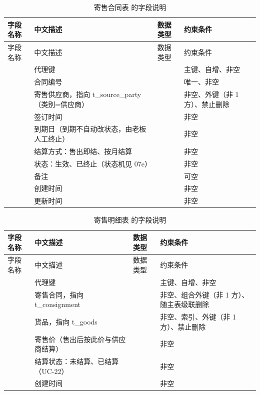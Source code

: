 \begin{longtable}{@{}L{3.5cm} L{4.1cm} L{2.9cm} L{4.0cm}@{}}
\caption{寄售合同表  的字段说明}\label{tab:f-t-consignment}\\
\toprule
字段名称 & 中文描述 & 数据类型 & 约束条件 \\
\midrule
\endfirsthead
\toprule
字段名称 & 中文描述 & 数据类型 & 约束条件 \\
\midrule
\endhead
\bottomrule
\endlastfoot
{} & 代理键 &  & 主键、自增、非空 \\
 & 合同编号 &  & 唯一、非空 \\
 & 寄售供应商，指向 t\_source\_party（类别=供应商） &  & 非空、外键（非 1 方）、禁止删除 \\
 & 签订时间 &  & 非空 \\
 & 到期日（到期不自动改状态，由老板人工终止） &  & 非空 \\
 & 结算方式：售出即结、按月结算 &  & 非空 \\
 & 状态：生效、已终止（状态机见 07e） &  & 非空 \\
 & 备注 &  & 可空 \\
 & 创建时间 &  & 非空 \\
 & 更新时间 &  & 非空 \\
\end{longtable}

\begin{longtable}{@{}L{3.5cm} L{4.1cm} L{2.9cm} L{4.0cm}@{}}
\caption{寄售明细表  的字段说明}\label{tab:f-t-consignment-item}\\
\toprule
字段名称 & 中文描述 & 数据类型 & 约束条件 \\
\midrule
\endfirsthead
\toprule
字段名称 & 中文描述 & 数据类型 & 约束条件 \\
\midrule
\endhead
\bottomrule
\endlastfoot
{} & 代理键 &  & 主键、自增、非空 \\
 & 寄售合同，指向 t\_consignment &  & 非空、组合外键（非 1 方）、随主表级联删除 \\
 & 货品，指向 t\_goods &  & 非空、索引、外键（非 1 方）、禁止删除 \\
 & 寄售价（售出后按此价与供应商结算） &  & 非空 \\
 & 结算状态：未结算、已结算（UC-22） &  & 非空 \\
 & 创建时间 &  & 非空 \\
\end{longtable}

